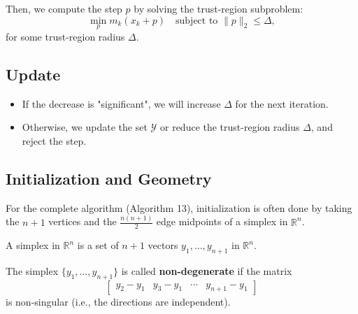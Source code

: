 Then, we compute the step $p$ by solving the trust-region subproblem:
\begin{equation}
    \min_p m_k(x_k + p) \quad \text{subject to } \|p\|_2 \le \Delta,
\end{equation}
for some trust-region radius $\Delta$.

\subsection{Update}
\begin{itemize}
    \item If the decrease is "significant", we will increase $\Delta$ for the next iteration.
    \item Otherwise, we update the set $\mathcal{Y}$ or reduce the trust-region radius $\Delta$, and reject the step.
\end{itemize}

\subsection{Initialization and Geometry}
For the complete algorithm (Algorithm 13), initialization is often done by taking the $n+1$ vertices and the $\frac{n(n+1)}{2}$ edge midpoints of a simplex in $\mathbb{R}^n$.

\begin{definition}[Simplex]
    A simplex in $\mathbb{R}^n$ is a set of $n+1$ vectors $y_1, \dots, y_{n+1}$ in $\mathbb{R}^n$.
    
    The simplex $\{y_1, \dots, y_{n+1}\}$ is called \textbf{non-degenerate} if the matrix
    \[
        \begin{bmatrix}
            y_2 - y_1 & y_3 - y_1 & \cdots & y_{n+1} - y_1
        \end{bmatrix}
    \]
    is non-singular (i.e., the directions are independent).
\end{definition}

